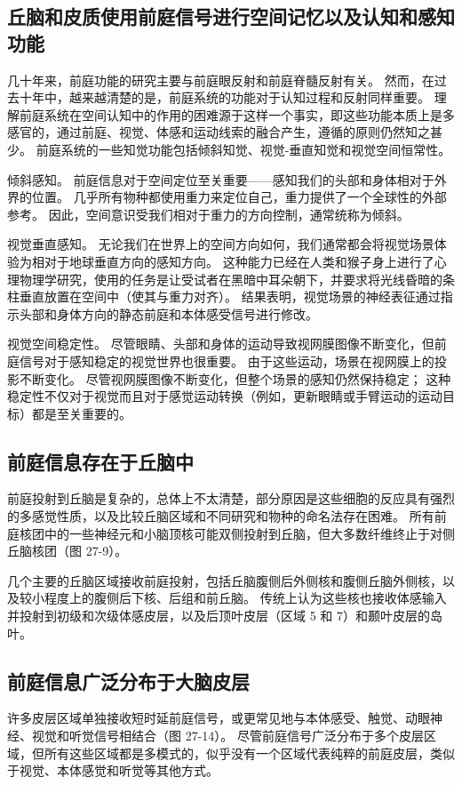 \subsection{丘脑和皮质使用前庭信号进行空间记忆以及认知和感知功能}
几十年来，前庭功能的研究主要与前庭眼反射和前庭脊髓反射有关。 然而，在过去十年中，越来越清楚的是，前庭系统的功能对于认知过程和反射同样重要。 理解前庭系统在空间认知中的作用的困难源于这样一个事实，即这些功能本质上是多感官的，通过前庭、视觉、体感和运动线索的融合产生，遵循的原则仍然知之甚少。 前庭系统的一些知觉功能包括倾斜知觉、视觉-垂直知觉和视觉空间恒常性。

倾斜感知。 前庭信息对于空间定位至关重要——感知我们的头部和身体相对于外界的位置。 几乎所有物种都使用重力来定位自己，重力提供了一个全球性的外部参考。 因此，空间意识受我们相对于重力的方向控制，通常统称为倾斜。

视觉垂直感知。 无论我们在世界上的空间方向如何，我们通常都会将视觉场景体验为相对于地球垂直方向的感知方向。 这种能力已经在人类和猴子身上进行了心理物理学研究，使用的任务是让受试者在黑暗中耳朵朝下，并要求将光线昏暗的条柱垂直放置在空间中（使其与重力对齐）。 结果表明，视觉场景的神经表征通过指示头部和身体方向的静态前庭和本体感受信号进行修改。

视觉空间稳定性。 尽管眼睛、头部和身体的运动导致视网膜图像不断变化，但前庭信号对于感知稳定的视觉世界也很重要。 由于这些运动，场景在视网膜上的投影不断变化。 尽管视网膜图像不断变化，但整个场景的感知仍然保持稳定； 这种稳定性不仅对于视觉而且对于感觉运动转换（例如，更新眼睛或手臂运动的运动目标）都是至关重要的。

\subsection{前庭信息存在于丘脑中}
前庭投射到丘脑是复杂的，总体上不太清楚，部分原因是这些细胞的反应具有强烈的多感觉性质，以及比较丘脑区域和不同研究和物种的命名法存在困难。 所有前庭核团中的一些神经元和小脑顶核可能双侧投射到丘脑，但大多数纤维终止于对侧丘脑核团（图 27-9）。

几个主要的丘脑区域接收前庭投射，包括丘脑腹侧后外侧核和腹侧丘脑外侧核，以及较小程度上的腹侧后下核、后组和前丘脑。 传统上认为这些核也接收体感输入并投射到初级和次级体感皮层，以及后顶叶皮层（区域 5 和 7）和颞叶皮层的岛叶。

\subsection{前庭信息广泛分布于大脑皮层}
许多皮层区域单独接收短时延前庭信号，或更常见地与本体感受、触觉、动眼神经、视觉和听觉信号相结合（图 27-14）。 尽管前庭信号广泛分布于多个皮层区域，但所有这些区域都是多模式的，似乎没有一个区域代表纯粹的前庭皮层，类似于视觉、本体感觉和听觉等其他方式。


